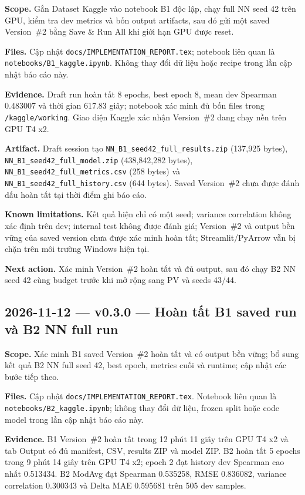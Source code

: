 \documentclass[11pt,a4paper]{article}
\newcommand{\code}[1]{\nolinkurl{#1}}
\begin{document}
\textbf{Scope.} Gắn Dataset Kaggle vào notebook B1 độc lập, chạy full NN seed 42 trên GPU, kiểm tra dev metrics và bốn output artifacts, sau đó gửi một saved Version~\#2 bằng Save \& Run All khi giới hạn GPU được reset.

\textbf{Files.} Cập nhật \code{docs/IMPLEMENTATION_REPORT.tex}; notebook liên quan là \code{notebooks/B1_kaggle.ipynb}. Không thay đổi dữ liệu hoặc recipe trong lần cập nhật báo cáo này.

\textbf{Evidence.} Draft run hoàn tất 8 epochs, best epoch 8, mean dev Spearman 0.483007 và thời gian 617.83 giây; notebook xác minh đủ bốn files trong \code{/kaggle/working}. Giao diện Kaggle xác nhận Version~\#2 đang chạy nền trên GPU T4 x2.

\textbf{Artifact.} Draft session tạo \code{NN_B1_seed42_full_results.zip} (137,925 bytes), \code{NN_B1_seed42_full_model.zip} (438,842,282 bytes), \code{NN_B1_seed42_full_metrics.csv} (258 bytes) và \code{NN_B1_seed42_full_history.csv} (644 bytes). Saved Version~\#2 chưa được đánh dấu hoàn tất tại thời điểm ghi báo cáo.

\textbf{Known limitations.} Kết quả hiện chỉ có một seed; variance correlation không xác định trên dev; internal test không được đánh giá; Version~\#2 và output bền vững của saved version chưa được xác minh hoàn tất; Streamlit/PyArrow vẫn bị chặn trên môi trường Windows hiện tại.

\textbf{Next action.} Xác minh Version~\#2 hoàn tất và đủ output, sau đó chạy B2 NN seed 42 cùng budget trước khi mở rộng sang PV và seeds 43/44.

\subsection*{2026-11-12 --- v0.3.0 --- Hoàn tất B1 saved run và B2 NN full run}

\textbf{Scope.} Xác minh B1 saved Version~\#2 hoàn tất và có output bền vững; bổ sung kết quả B2 NN full seed 42, best epoch, metrics cuối và runtime; cập nhật các bước tiếp theo.

\textbf{Files.} Cập nhật \code{docs/IMPLEMENTATION_REPORT.tex}. Notebook liên quan là \code{notebooks/B2_kaggle.ipynb}; không thay đổi dữ liệu, frozen split hoặc code model trong lần cập nhật báo cáo này.

\textbf{Evidence.} B1 Version~\#2 hoàn tất trong 12 phút 11 giây trên GPU T4 x2 và tab Output có đủ manifest, CSV, results ZIP và model ZIP. B2 hoàn tất 5 epochs trong 9 phút 14 giây trên GPU T4 x2; epoch 2 đạt history dev Spearman cao nhất 0.513434. B2 ModAvg đạt Spearman 0.535258, RMSE 0.836082, variance correlation 0.300343 và Delta MAE 0.595681 trên 505 dev samples.
\end{document}
